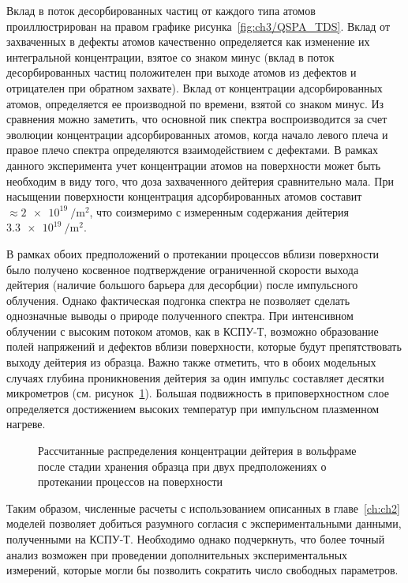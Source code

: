 Вклад в поток десорбированных частиц от каждого типа атомов проиллюстрирован на правом графике рисунка~\cref{fig:ch3/QSPA_TDS}. Вклад от захваченных в дефекты атомов качественно определяется как изменение их интегральной концентрации, взятое со знаком минус (вклад в поток десорбированных частиц положителен при выходе атомов из дефектов и отрицателен при обратном захвате). Вклад от концентрации адсорбированных атомов, определяется ее производной по времени, взятой со знаком минус. Из сравнения можно заметить, что основной пик спектра воспроизводится за счет эволюции концентрации адсорбированных атомов, когда начало левого плеча и правое плечо спектра определяются взаимодействием с дефектами. В рамках данного эксперимента учет концентрации атомов на поверхности может быть необходим в виду того, что доза захваченного дейтерия сравнительно мала. При насыщении поверхности концентрация адсорбированных атомов составит \( \approx \SI{2e19}{\per\meter\squared} \), что соизмеримо с измеренным содержания дейтерия \( \SI{3.3e19}{\per\meter\squared}\).

В рамках обоих предположений о протекании процессов вблизи поверхности было получено косвенное подтверждение ограниченной скорости выхода дейтерия (наличие большого барьера для десорбции) после импульсного облучения. Однако фактическая подгонка спектра не позволяет сделать однозначные выводы о природе полученного спектра. При интенсивном облучении с высоким потоком атомов, как в КСПУ-Т, возможно образование полей напряжений и дефектов вблизи поверхности, которые будут препятствовать выходу дейтерия из образца. Важно также отметить, что в обоих модельных случаях глубина проникновения дейтерия за один импульс составляет десятки микрометров (см. рисунок~\cref{fig:ch3/QSPA_conc}). Большая подвижность в приповерхностном слое определяется достижением высоких температур при импульсном плазменном нагреве.
\begin{figure}[ht]
	\caption{Рассчитанные распределения концентрации дейтерия в вольфраме после стадии хранения образца при двух предположениях о протекании процессов на поверхности}\label{fig:ch3/QSPA_conc}
\end{figure}
Таким образом, численные расчеты с использованием описанных в главе~\cref{ch:ch2} моделей позволяет добиться разумного согласия с экспериментальными данными, полученными на КСПУ-Т. Необходимо однако подчеркнуть, что более точный анализ возможен при проведении дополнительных экспериментальных измерений, которые могли бы позволить сократить число свободных параметров.

